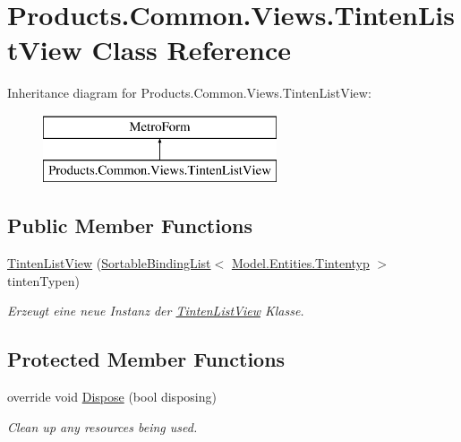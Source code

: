 \hypertarget{class_products_1_1_common_1_1_views_1_1_tinten_list_view}{}\section{Products.\+Common.\+Views.\+Tinten\+List\+View Class Reference}
\label{class_products_1_1_common_1_1_views_1_1_tinten_list_view}
Inheritance diagram for Products.\+Common.\+Views.\+Tinten\+List\+View\+:\begin{figure}[H]
\begin{center}
\leavevmode
\includegraphics[height=2.000000cm]{class_products_1_1_common_1_1_views_1_1_tinten_list_view}
\end{center}
\end{figure}
\subsection*{Public Member Functions}
\begin{DoxyCompactItemize}
\item 
\hyperlink{class_products_1_1_common_1_1_views_1_1_tinten_list_view_a25a8ea02e6c11c9a76f6cc912a509ee1}{Tinten\+List\+View} (\hyperlink{class_products_1_1_common_1_1_sortable_binding_list}{Sortable\+Binding\+List}$<$ \hyperlink{class_products_1_1_model_1_1_entities_1_1_tintentyp}{Model.\+Entities.\+Tintentyp} $>$ tinten\+Typen)
\begin{DoxyCompactList}\small\item\em Erzeugt eine neue Instanz der \hyperlink{class_products_1_1_common_1_1_views_1_1_tinten_list_view}{Tinten\+List\+View} Klasse. \end{DoxyCompactList}\end{DoxyCompactItemize}
\subsection*{Protected Member Functions}
\begin{DoxyCompactItemize}
\item 
override void \hyperlink{class_products_1_1_common_1_1_views_1_1_tinten_list_view_acbab4c8e1fc5b5ac0cff3ae8105d63c9}{Dispose} (bool disposing)
\begin{DoxyCompactList}\small\item\em Clean up any resources being used. \end{DoxyCompactList}\end{DoxyCompactItemize}


